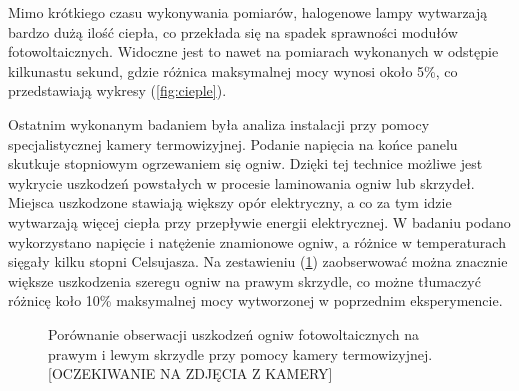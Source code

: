 \documentclass[12pt, a4paper]{article}
\let\oldref\ref
\renewcommand{\ref}[1]{(\oldref{#1})}
\begin{document}
Mimo krótkiego czasu wykonywania pomiarów, halogenowe lampy wytwarzają bardzo dużą ilość ciepła, co przekłada się na spadek sprawności modułów fotowoltaicznych. Widoczne jest to nawet na pomiarach wykonanych w odstępie kilkunastu sekund, gdzie różnica maksymalnej mocy wynosi około 5\%, co przedstawiają wykresy \ref{fig:cieple}. 

Ostatnim wykonanym badaniem była analiza instalacji przy pomocy specjalistycznej kamery termowizyjnej. Podanie napięcia na końce panelu skutkuje stopniowym ogrzewaniem się ogniw. Dzięki tej technice możliwe jest wykrycie uszkodzeń powstałych w procesie laminowania ogniw lub skrzydeł. Miejsca uszkodzone stawiają większy opór elektryczny, a co za tym idzie wytwarzają więcej ciepła przy przepływie energii elektrycznej. W badaniu podano wykorzystano napięcie i natężenie znamionowe ogniw, a różnice w temperaturach sięgały kilku stopni Celsujasza. Na zestawieniu \ref{fig:uszkodzenia} zaobserwować można znacznie większe uszkodzenia szeregu ogniw na prawym skrzydle, co możne tłumaczyć różnicę koło 10\% maksymalnej mocy wytworzonej w poprzednim eksperymencie.

\begin{figure}[ht]
    \centering
    \qquad
    \caption{Porównanie obserwacji uszkodzeń ogniw fotowoltaicznych na prawym i lewym skrzydle przy pomocy kamery termowizyjnej. [OCZEKIWANIE NA ZDJĘCIA Z KAMERY]}
    \label{fig:uszkodzenia}
\end{figure}
\end{document}
